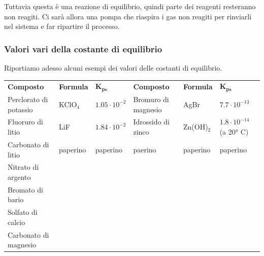 Tuttavia questa è una reazione di equilibrio, quindi parte dei reagenti resteranno non reagiti. Ci sarà allora una pompa che riaspira i gas non reagiti per rinviarli nel sistema e far ripartire il processo.

\subsubsection{Valori vari della costante di equilibrio}

Riportiamo adesso alcuni esempi dei valori delle costanti di equilibrio.

\hspace{-1cm}\footnotesize\begin{tabular}{p{4cm}p{1.6cm}p{2cm}p{4cm}p{1.6cm}p{2cm}}
    \textbf{Composto} & \textbf{Formula} & $\boldsymbol{K_{ps}}$ & \textbf{Composto} & \textbf{Formula} & $\boldsymbol{K_{ps}}$\\[0.7ex]
    Perclorato di potassio & KClO$_4$ & $1.05 \cdot 10^{-2}$ & Bromuro di magnesio & AgBr & $7.7 \cdot 10^{-13}$\\[0.7ex]
    Fluoruro di litio & LiF & $1.84 \cdot 10^{-2}$ & Idrossido di zinco & Zn(OH)$_2$ & $1.8 \cdot 10^{-14}$ (a 20° C)\\[0.7ex]
    Carbonato di litio & paperino & paperino & paerino & paperino & paperino\\[0.7ex]
    Nitrato di argento&&&&&\\[0.7ex]
    Bromato di bario&&&&&\\[0.7ex]
    Solfato di calcio&&&&&\\[0.7ex]
    Carbonato di magnesio&&&&&\\[0.7ex]
\end{tabular}


